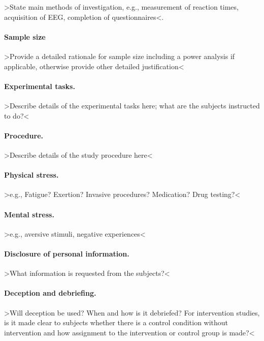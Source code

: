 \documentclass[11pt,twoside,a4paper]{article}
\begin{document}
>State main methods of investigation, e.g., measurement of reaction times, acquisition of EEG, completion of questionnaires<.

\paragraph{Sample size}

>Provide a detailed rationale for sample size including a power analysis if applicable, otherwise provide other detailed justification<

\paragraph{Experimental tasks.}

>Describe details of the experimental tasks here; what are the subjects instructed to do?<

\paragraph{Procedure.}

>Describe details of the study procedure here<

\paragraph{Physical stress.}

>e.g., Fatigue? Exertion? Invasive procedures? Medication? Drug testing?<

\paragraph{Mental stress.}

>e.g., aversive stimuli, negative experiences<

\paragraph{Disclosure of personal information.}

>What information is requested from the subjects?<

\paragraph{Deception and debriefing.}

>Will deception be used? When and how is it debriefed?
For intervention studies, is it made clear to subjects whether there is a control condition without intervention and how assignment to the intervention or control group is made?<
\end{document}
